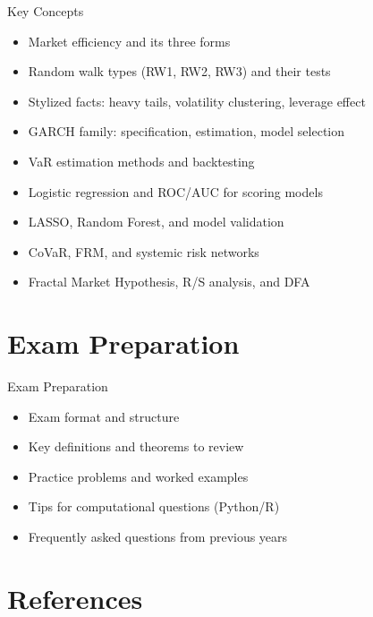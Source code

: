 \documentclass[9pt, aspectratio=169, t]{beamer}
\theoremstyle{definition}
\begin{document}
\begin{frame}{Key Concepts}
    \begin{itemize}
        \item Market efficiency and its three forms
        \item Random walk types (RW1, RW2, RW3) and their tests
        \item Stylized facts: heavy tails, volatility clustering, leverage effect
        \item GARCH family: specification, estimation, model selection
        \item VaR estimation methods and backtesting
        \item Logistic regression and ROC/AUC for scoring models
        \item LASSO, Random Forest, and model validation
        \item CoVaR, FRM, and systemic risk networks
        \item Fractal Market Hypothesis, R/S analysis, and DFA
    \end{itemize}
\end{frame}

\section{Exam Preparation}

\begin{frame}{Exam Preparation}
    \begin{itemize}
        \item Exam format and structure
        \item Key definitions and theorems to review
        \item Practice problems and worked examples
        \item Tips for computational questions (Python/R)
        \item Frequently asked questions from previous years
    \end{itemize}
\end{frame}

\section{References}
\end{document}
